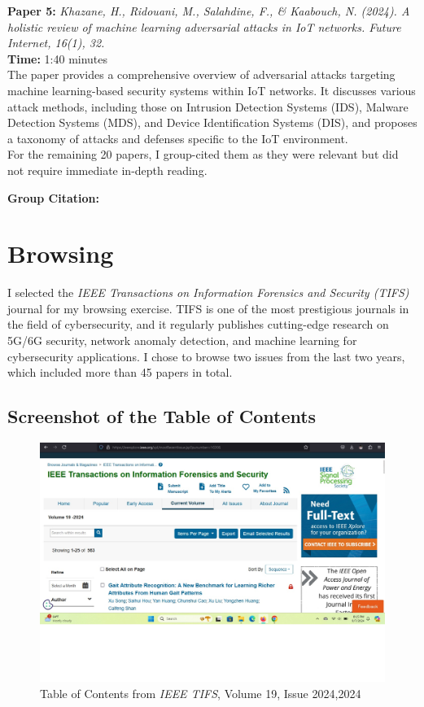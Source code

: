 \documentclass[10pt]{article}
\begin{document}
\noindent\textbf{Paper 5:} \textit{Khazane, H., Ridouani, M., Salahdine, F., \& Kaabouch, N. (2024). A holistic review of machine learning adversarial attacks in IoT networks. Future Internet, 16(1), 32.} \\
\textbf{Time:} 1:40 minutes \\
The paper provides a comprehensive overview of adversarial attacks targeting machine learning-based security systems within IoT networks. It discusses various attack methods, including those on Intrusion Detection Systems (IDS), Malware Detection Systems (MDS), and Device Identification Systems (DIS), and proposes a taxonomy of attacks and defenses specific to the IoT environment. \\

\noindent For the remaining 20 papers, I group-cited them as they were relevant but did not require immediate in-depth reading.

\noindent \textbf{Group Citation:} 
\nocite{*}
\printbibliography[keyword={rest20}]

\section{ Browsing}

I selected the \textit{IEEE Transactions on Information Forensics and Security (TIFS)} journal for my browsing exercise. TIFS is one of the most prestigious journals in the field of cybersecurity, and it regularly publishes cutting-edge research on 5G/6G security, network anomaly detection, and machine learning for cybersecurity applications. I chose to browse two issues from the last two years, which included more than 45 papers in total.

\subsection{Screenshot of the Table of Contents}
\begin{figure}[ht]
    \centering
    \includegraphics[width=\textwidth]{content.jpg} 
    \caption{Table of Contents from \textit{IEEE TIFS}, Volume 19, Issue 2024,2024}
    \label{fig:toc}
\end{figure}
\end{document}
